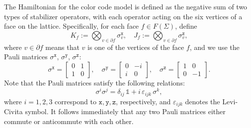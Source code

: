 \documentclass[a4paper,11pt]{article}
\theoremstyle{definition}
\theoremstyle{remark}
\theoremstyle{remark}
\begin{document}
The Hamiltonian for the color code model is defined as the negative sum of two types of stabilizer operators, with each operator acting on the six vertices of a face on the lattice.
Specifically, for each face $f \in F(\Sigma)$, define 
\begin{equation*}
    K_f:= \bigotimes_{v\in  \partial f} \sigma_v^{\mathtt{x}},\quad J_f:= \bigotimes_{v\in  \partial f} \sigma_v^{\mathtt{z}},
\end{equation*}
where $v\in\partial f$ means that $v$ is one of the vertices of the face $f$, and
we use the Pauli matrices $\sigma^{\mathtt{x}}$, $\sigma^{\mathtt{y}}$, $\sigma^{\mathtt{z}}$:
\begin{equation*}
    \sigma^{\mathtt{x}}= \begin{bmatrix}
        0 & 1 \\
        1 & 0
    \end{bmatrix}, \quad 
    \sigma^{\mathtt{y}}= \begin{bmatrix}
        0 & -i \\
        i & 0
    \end{bmatrix}, \quad 
    \sigma^{\mathtt{z}}= \begin{bmatrix}
        1 & 0 \\
        0 & -1
    \end{bmatrix}. 
\end{equation*}
Note that the Pauli matrices satisfy the following relations:
\begin{equation*}
   \sigma^i \sigma^j = \delta_{ij} \, \mathds{1} + i \, \varepsilon_{ijk} \, \sigma^k,
\end{equation*}
where $i = 1, 2, 3$ correspond to $\mathtt{x}, \mathtt{y}, \mathtt{z}$, respectively, and $\varepsilon_{ijk}$ denotes the Levi-Civita symbol.  
It follows immediately that any two Pauli matrices either commute or anticommute with each other.
\end{document}
